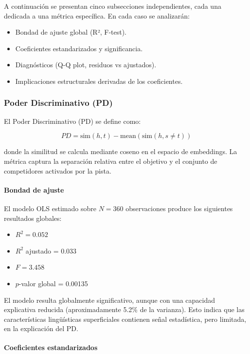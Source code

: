 A continuación se presentan cinco subsecciones independientes, cada una dedicada a una métrica específica. En cada caso se analizarán:

\begin{itemize}
\item Bondad de ajuste global (R², F-test).
\item Coeficientes estandarizados y significancia.
\item Diagnósticos (Q-Q plot, residuos vs ajustados).
\item Implicaciones estructurales derivadas de los coeficientes.
\end{itemize}

\subsubsection{Poder Discriminativo (PD)}

El Poder Discriminativo (PD) se define como:

\[
PD = \text{sim}(h,t) - \text{mean}(\text{sim}(h, s \neq t))
\]

donde la similitud se calcula mediante coseno en el espacio de embeddings. La métrica captura la separación relativa entre el objetivo y el conjunto de competidores activados por la pista.

\paragraph{Bondad de ajuste}

El modelo OLS estimado sobre $N = 360$ observaciones produce los siguientes resultados globales:

\begin{itemize}
\item $R^2 = 0.052$
\item $R^2$ ajustado = 0.033
\item $F = 3.458$
\item $p$-valor global = 0.00135
\end{itemize}

El modelo resulta globalmente significativo, aunque con una capacidad explicativa reducida (aproximadamente 5.2\% de la varianza). Esto indica que las características lingüísticas superficiales contienen señal estadística, pero limitada, en la explicación del PD.

\paragraph{Coeficientes estandarizados}


